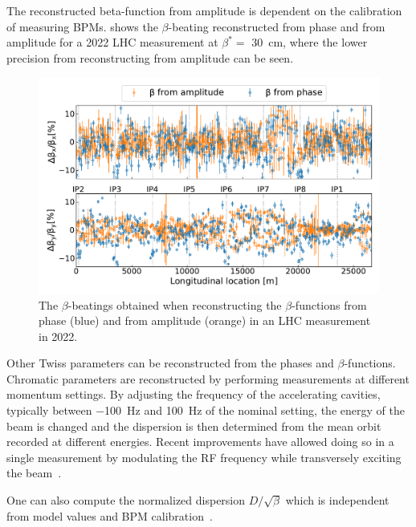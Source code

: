 The reconstructed \gls{beta-function} from amplitude is dependent on the calibration of measuring BPMs.
 shows the \(\beta\)-beating reconstructed from phase and from amplitude for a \num{2022} LHC measurement at \(\beta^{\ast} =\) \qty{30}{\centi\meter}, where the lower precision from reconstructing from amplitude can be seen.

\begin{figure}[!htb]
  \centering
  \includegraphics*[width=\linewidth]{Figures/Optics_Measurements_Corrections_at_LHC/betabeat_phase_vs_amp.pdf}
  \caption{The \(\beta\)-beatings obtained when reconstructing the \(\beta\)-functions from phase (\textcolor{mplblue}{blue}) and from amplitude (\textcolor{mplorange}{orange}) in an LHC measurement in \num{2022}.}
  \label{figure:betabeating_phase_vs_amp}
\end{figure}

Other Twiss parameters can be reconstructed from the phases and \(\beta\)-functions.
Chromatic parameters are reconstructed by performing measurements at different momentum settings.
By adjusting the frequency of the accelerating cavities, typically between \qty{-100}{\hertz} and \qty{+100}{\hertz} of the nominal setting, the energy of the beam is changed and the dispersion is then determined from the mean orbit recorded at different energies.
Recent improvements have allowed doing so in a single measurement by modulating the RF frequency while transversely exciting the beam~\cite{PHD:Malina, IPAC:Malina:3D_Excitation}.

One can also compute the normalized dispersion \(D / \sqrt{\beta}\) which is independent from model values and BPM calibration~\cite{PAC:Calaga:BPM_Calibration_Independent_LHC_Optics_Correction}.


